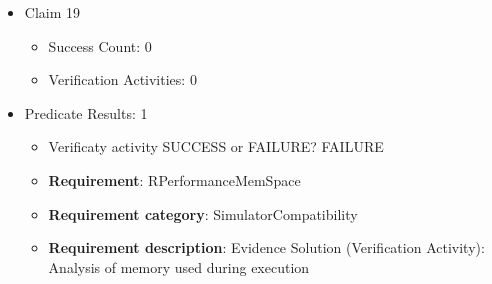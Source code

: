 \documentclass{article}
\begin{document}
\begin{itemize}
  				  \item Claim 19
				\begin{itemize}
			    	\item Success Count: 0 
			    	\item Verification Activities: 0
				\end{itemize}
				
									    
				\item Predicate Results: 1
					\begin{itemize}				
					\item Verificaty activity SUCCESS or FAILURE? FAILURE
					
					\item \textbf{Requirement}: RPerformanceMemSpace 
					\item \textbf{Requirement category}: SimulatorCompatibility
					\item \textbf{Requirement description}: Evidence Solution (Verification Activity): Analysis of memory used during execution
					\end{itemize}

			\end{itemize}

		
\end{document}
